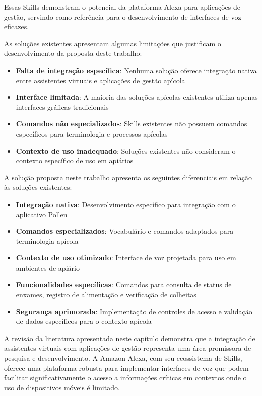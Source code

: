 Essas Skills demonstram o potencial da plataforma Alexa para aplicações de gestão, servindo como referência para o desenvolvimento de interfaces de voz eficazes.


As soluções existentes apresentam algumas limitações que justificam o desenvolvimento da proposta deste trabalho:

\begin{itemize}
    \item \textbf{Falta de integração específica}: Nenhuma solução oferece integração nativa entre assistentes virtuais e aplicações de gestão apícola
    \item \textbf{Interface limitada}: A maioria das soluções apícolas existentes utiliza apenas interfaces gráficas tradicionais
    \item \textbf{Comandos não especializados}: Skills existentes não possuem comandos específicos para terminologia e processos apícolas
    \item \textbf{Contexto de uso inadequado}: Soluções existentes não consideram o contexto específico de uso em apiários
\end{itemize}


A solução proposta neste trabalho apresenta os seguintes diferenciais em relação às soluções existentes:

\begin{itemize}
    \item \textbf{Integração nativa}: Desenvolvimento específico para integração com o aplicativo Pollen
    \item \textbf{Comandos especializados}: Vocabulário e comandos adaptados para terminologia apícola
    \item \textbf{Contexto de uso otimizado}: Interface de voz projetada para uso em ambientes de apiário
    \item \textbf{Funcionalidades específicas}: Comandos para consulta de status de enxames, registro de alimentação e verificação de colheitas
    \item \textbf{Segurança aprimorada}: Implementação de controles de acesso e validação de dados específicos para o contexto apícola
\end{itemize}


A revisão da literatura apresentada neste capítulo demonstra que a integração de assistentes virtuais com aplicações de gestão representa uma área promissora de pesquisa e desenvolvimento. 
A Amazon Alexa, com seu ecossistema de Skills, oferece uma plataforma robusta para implementar interfaces de voz que podem facilitar significativamente o acesso a informações críticas em contextos onde o uso de dispositivos móveis é limitado.

